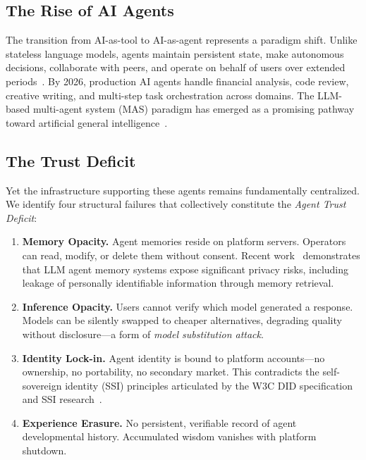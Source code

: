 \documentclass[10pt,a4paper]{article}
\theoremstyle{definition}
\theoremstyle{plain}
\begin{document}
\subsection{The Rise of AI Agents}

The transition from AI-as-tool to AI-as-agent represents a paradigm shift. Unlike stateless language models, agents maintain persistent state, make autonomous decisions, collaborate with peers, and operate on behalf of users over extended periods~\cite{agentai2025}. By 2026, production AI agents handle financial analysis, code review, creative writing, and multi-step task orchestration across domains. The LLM-based multi-agent system (MAS) paradigm has emerged as a promising pathway toward artificial general intelligence~\cite{multiagent-survey2024, multiagent-collab2025}.

\subsection{The Trust Deficit}

Yet the infrastructure supporting these agents remains fundamentally centralized. We identify four structural failures that collectively constitute the \emph{Agent Trust Deficit}:

\begin{enumerate}[leftmargin=1.8em, itemsep=3pt, parsep=0pt]
  \item \textbf{Memory Opacity.} Agent memories reside on platform servers. Operators can read, modify, or delete them without consent. Recent work~\cite{memory-privacy2025} demonstrates that LLM agent memory systems expose significant privacy risks, including leakage of personally identifiable information through memory retrieval.
  \item \textbf{Inference Opacity.} Users cannot verify which model generated a response. Models can be silently swapped to cheaper alternatives, degrading quality without disclosure---a form of \emph{model substitution attack}.
  \item \textbf{Identity Lock-in.} Agent identity is bound to platform accounts---no ownership, no portability, no secondary market. This contradicts the self-sovereign identity (SSI) principles articulated by the W3C DID specification~\cite{w3c-did2022} and SSI research~\cite{ssi-survey2024}.
  \item \textbf{Experience Erasure.} No persistent, verifiable record of agent developmental history. Accumulated wisdom vanishes with platform shutdown.
\end{enumerate}
\end{document}
